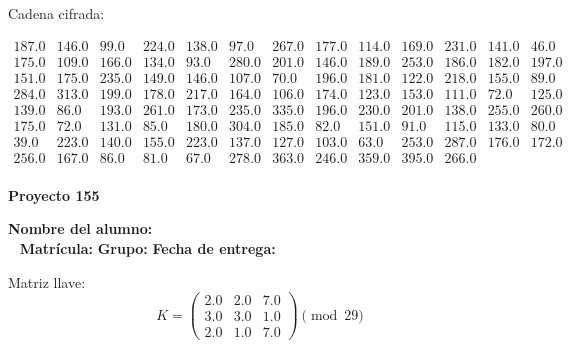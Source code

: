 \documentclass[12pt]{article}
\begin{document}
Cadena cifrada:
\begin{center}
$\begin{array}{lllllllllllll}
187.0 & 146.0 & 99.0 & 224.0 & 138.0 & 97.0 & 267.0 & 177.0 & 114.0 & 169.0 & 231.0 & 141.0 & 46.0\\
175.0 & 109.0 & 166.0 & 134.0 & 93.0 & 280.0 & 201.0 & 146.0 & 189.0 & 253.0 & 186.0 & 182.0 & 197.0\\
151.0 & 175.0 & 235.0 & 149.0 & 146.0 & 107.0 & 70.0 & 196.0 & 181.0 & 122.0 & 218.0 & 155.0 & 89.0\\
284.0 & 313.0 & 199.0 & 178.0 & 217.0 & 164.0 & 106.0 & 174.0 & 123.0 & 153.0 & 111.0 & 72.0 & 125.0\\
139.0 & 86.0 & 193.0 & 261.0 & 173.0 & 235.0 & 335.0 & 196.0 & 230.0 & 201.0 & 138.0 & 255.0 & 260.0\\
175.0 & 72.0 & 131.0 & 85.0 & 180.0 & 304.0 & 185.0 & 82.0 & 151.0 & 91.0 & 115.0 & 133.0 & 80.0\\
39.0 & 223.0 & 140.0 & 155.0 & 223.0 & 137.0 & 127.0 & 103.0 & 63.0 & 253.0 & 287.0 & 176.0 & 172.0\\
256.0 & 167.0 & 86.0 & 81.0 & 67.0 & 278.0 & 363.0 & 246.0 & 359.0 & 395.0 & 266.0\\
\end{array}$
\end{center}

\newpage


\textbf{Proyecto 155}

\textbf{Nombre del alumno:} \underline{\hspace{13cm}}\\\
\vspace{1cm}
\textbf{Matrícula:} \underline{\hspace{4cm}} \hspace{1cm}
\textbf{Grupo:} \underline{\hspace{2cm}}
\textbf{Fecha de entrega:} \underline{\hspace{2cm}}

\medskip

Matriz llave:
\[
K = \begin{pmatrix}
2.0 & 2.0 & 7.0\\
3.0 & 3.0 & 1.0\\
2.0 & 1.0 & 7.0
\end{pmatrix} \pmod{29}
\]
\end{document}
